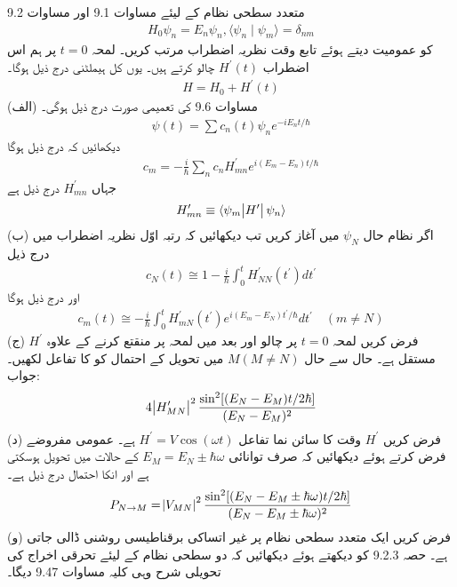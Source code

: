 متعدد سطحی نظام کے لیئے مساوات \num{9.1} اور مساوات \num{9.2} 
\begin{align}
	H_0\psi_n = E_n\psi_n, \langle \psi_n\mid\psi_m \rangle = \delta_{nm}
\end{align}
کو عمومیت دیتے ہوئے تابع وقت نظریہ اضطراب  مرتب کریں۔ لمحہ \(t=0\) پر ہم اس اضطراب \(H^\prime(t)\) چالو کرتے ہیں۔ یوں کل ہیملٹنی درج ذیل ہوگا۔
\begin{align}
	H = H_0 + H^\prime(t)
\end{align}
(الف) مساوات \num{9.6} کی تعمیمی صورت درج ذیل ہوگی۔
\begin{align}
	\psi(t) = \sum c_n(t)\psi_ne^{-iE_nt/\hbar}
\end{align}
دیکھائیں کہ درج ذیل ہوگا
\begin{align}
	c_m = -\frac{i}{\hbar}\sum_{n} c_nH^\prime_{mn}e^{i(E_m-E_n)t/\hbar}
\end{align}
جہاں \(H^\prime_{mn}\) درج ذیل ہے
\begin{align}
	H^\prime_{mn} \equiv \langle \psi_m\abs{H^\prime}\psi_n \rangle
\end{align}
(ب) اگر نظام حال \(\psi_N\) میں آغاز کریں تب دیکھائیں کہ رتبہ اوّل نظریہ اضطراب میں درج ذیل
\begin{align}
	c_N(t)\cong1-\frac{i}{\hbar}\int_{0}^{t}H^\prime_{NN}(t^\prime)dt^\prime
\end{align}
اور درج ذیل ہوگا
\begin{align}
	c_m(t)\cong-\frac{i}{\hbar}\int_{0}^{t}H^\prime_{mN}(t^\prime)e^{i(E_m-E_N)t^\prime/\hbar}dt^\prime \quad(m\neq N)
\end{align}
(ج) فرض کریں لمحہ \(t=0\) پر چالو اور بعد میں لمحہ  پر منقتع کرنے کے علاوہ \(H^\prime\) مستقل ہے۔ حال  سے حال \(M(M\neq N)\) میں تحویل کے احتمال کو  کا تفاعل لکھیں۔ جواب:
\begin{align}
	4\abs{H^\prime_{MN}}^2\frac{\sin^2[(E_N-E_M)t/2\hbar]}{(E_N-E_M)^2}
\end{align}
(د) فرض کریں \(H^\prime\) وقت کا سائن نما تفاعل \(H^\prime=V\cos(\omega t)\) ہے۔ عمومی مفروضے فرض کرتے ہوئے دیکھائیں کہ صرف توانائی \(E_M = E_N\pm\hbar\omega\) کے حالات میں تحویل ہوسکتی ہے اور انکا احتمال درج ذیل ہے۔
\begin{align}
	P_{N\rightarrow M} = \abs{V_{MN}}^2\frac{\sin^2[(E_N-E_M\pm\hbar\omega)t/2\hbar]}{(E_N-E_M\pm\hbar\omega)^2}
\end{align}
(و) فرض کریں ایک متعدد سطحی نظام پر غیر اتساکی برقناطیسی روشنی ڈالی جاتی ہے۔ حصہ 9.2.3 کو دیکھتے ہوئے دیکھائیں کہ دو سطحی نظام کے لیئے تحرقی اخراج کی تحویلی شرح وہی کلیہ مساوات \num{9.47} دیگا۔
